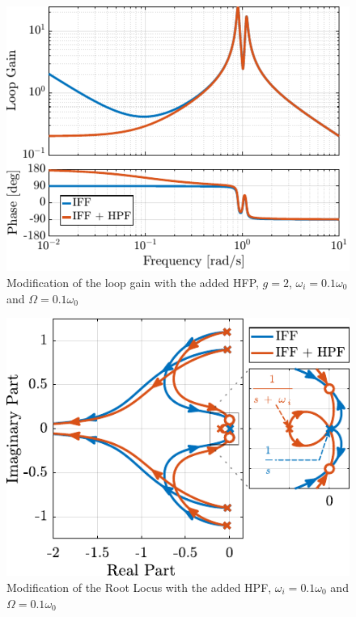 \documentclass[10pt]{iopart}
\begin{document}
\begin{figure}[htbp]
\centering
\includegraphics[scale=1,scale=0.95]{figs/fig08.pdf}
\caption{\label{fig:loop_gain_modified_iff}Modification of the loop gain with the added HFP, \(g = 2\), \(\omega_i = 0.1 \omega_0\) and \(\Omega = 0.1 \omega_0\)}
\end{figure}

\begin{figure}[htbp]
\centering
\includegraphics[scale=1,scale=1]{figs/fig09.pdf}
\caption{\label{fig:root_locus_modified_iff}Modification of the Root Locus with the added HPF, \(\omega_i = 0.1 \omega_0\) and \(\Omega = 0.1 \omega_0\)}
\end{figure}
\end{document}
